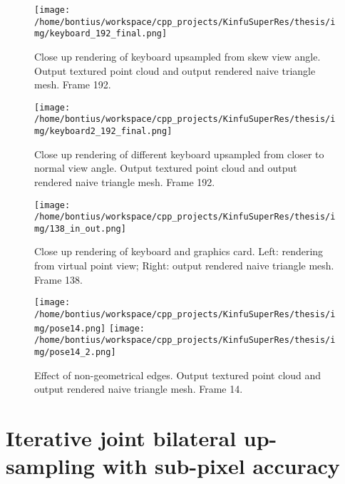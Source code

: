 \documentclass{ucl_thesis}
\begin{document}
\begin{figure}[h!]\centering
    \texttt{[image: /home/bontius/workspace/cpp\_projects/KinfuSuperRes/thesis/img/keyboard\_192\_final.png]}
    \caption{Close up rendering of keyboard upsampled from skew view angle. Output textured point cloud and output rendered naive triangle mesh. Frame 192.}
    \label{fig:keyboard_192_final}
\end{figure}

\begin{figure}[h!]\centering
    \texttt{[image: /home/bontius/workspace/cpp\_projects/KinfuSuperRes/thesis/img/keyboard2\_192\_final.png]}
    \caption{Close up rendering of different keyboard upsampled from closer to normal view angle. Output textured point cloud and output rendered naive triangle mesh. Frame 192.}
    \label{fig:keyboard2_192_final}
\end{figure}

\begin{figure}[h!]\centering
    \texttt{[image: /home/bontius/workspace/cpp\_projects/KinfuSuperRes/thesis/img/138\_in\_out.png]}
    \caption{Close up rendering of keyboard and graphics card. Left: rendering from virtual point view; Right: output rendered naive triangle mesh. Frame 138.}
    \label{fig:pose_138_in_out}
\end{figure}

\begin{figure}[h!]\centering
    \texttt{[image: /home/bontius/workspace/cpp\_projects/KinfuSuperRes/thesis/img/pose14.png]}
    \texttt{[image: /home/bontius/workspace/cpp\_projects/KinfuSuperRes/thesis/img/pose14\_2.png]}
    \caption{Effect of non-geometrical edges. Output textured point cloud and output rendered naive triangle mesh. Frame 14.}
    \label{fig:pose14}
\end{figure}

\section{Iterative joint bilateral up-sampling with sub-pixel accuracy}
\label{sec:yang}
\end{document}
